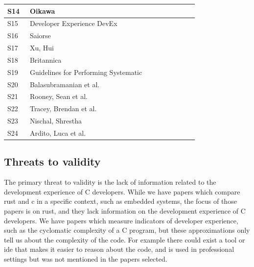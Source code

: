 \documentclass[conference]{IEEEtran}
\begin{document}
\begin{table}[!htbp]
\begin{tabular}{p{0.1\linewidth}p{0.65\linewidth}p{0.1\linewidth}}
        \hline
        S14 & Oikawa                               & \cite{oikawaExperienceDevelopingFAT2023}                   \\
        \hline
        S15 & Developer Experience DevEx           & \cite{DeveloperExperienceDevEx}                            \\
        \hline
        S16 & Saiorse                              & \cite{saoirseWhyAsyncRust2023}                             \\
        \hline
        S17 & Xu, Hui                              & \cite{xuMemorySafetyChallengeConsidered2021}               \\
        \hline
        S18 & Britannica                           & \cite{SystemsProgrammingDefinition}                        \\
        \hline
        S19 & Guidelines for Performing Systematic & \cite{GuidelinesPerformingSystematic}                      \\
        \hline
        S20 & Balasubramanian et al.               & \cite{balasubramanianSystemProgrammingRust2017}            \\
        \hline
        S21 & Rooney, Sean et al.                  & \cite{rooneyEvaluatingFFTPerformance2023a}                 \\
        \hline
        S22 & Tracey, Brendan et al.               & \cite{traceyGradingCurveHow2023}                           \\
        \hline
        S23 & Nischal, Shrestha                    & \cite{shresthaHereWeGo2020}                                \\
        \hline
        S24 & Ardito, Luca et al.                  & \cite{arditoEvaluationRustCode2021}                        \\
        \hline

    \end{tabular}
\end{table}
\subsection{Threats to validity}
{
    The primary threat to validity is the lack of information related to the development experience of C developers. While we have papers which compare rust and c in a specific context, such as embedded systems,
    the focus of those papers is on rust, and they lack information on the development experience of C developers. We have papers which measure indicators of developer experience, such as the cyclomatic complexity
    of a C program, but these approximations only tell us about the complexity of the code. For example there could exist a tool or ide that makes it easier to reason about the code, and is used in professional settings but
    was not mentioned in the papers selected.
}
\end{document}
